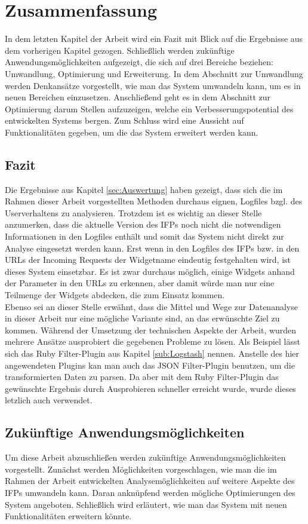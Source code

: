 \section{Zusammenfassung}
\label{sec:Zusammenfassung}
In dem letzten Kapitel der Arbeit wird ein Fazit mit Blick auf die Ergebnisse aus dem vorherigen Kapitel gezogen. Schließlich werden zukünftige Anwendungsmöglichkeiten aufgezeigt, die sich auf drei Bereiche beziehen: Umwandlung, Optimierung und Erweiterung. In dem Abschnitt zur Umwandlung werden Denkansätze vorgestellt, wie man das System umwandeln kann, um es in neuen Bereichen einzusetzen. Anschließend geht es in dem Abschnitt zur Optimierung darum Stellen aufzuzeigen, welche ein Verbesserungspotential des entwickelten Systems bergen. Zum Schluss wird eine Aussicht auf Funktionalitäten gegeben, um die das System erweitert werden kann.
\subsection{Fazit}
\label{sub:Fazit}
Die Ergebnisse aus Kapitel \ref{sec:Auswertung} haben gezeigt, dass sich die im Rahmen dieser Arbeit vorgestellten Methoden durchaus eignen, Logfiles bzgl. des Userverhaltens zu analysieren. Trotzdem ist es wichtig an dieser Stelle anzumerken, dass die aktuelle Version des IFPs noch nicht die notwendigen Informationen in den Logfiles enthält und somit das System nicht direkt zur Analyse eingesetzt werden kann. Erst wenn in den Logfiles des IFPs bzw. in den URLs der Incoming Requests der Widgetname eindeutig festgehalten wird, ist dieses System einsetzbar. Es ist zwar durchaus möglich, einige Widgets anhand der Parameter in den URLs zu erkennen, aber damit würde man nur eine Teilmenge der Widgets abdecken, die zum Einsatz kommen.\\
Ebenso sei an dieser Stelle erwähnt, dass die Mittel und Wege zur Datenanalyse in dieser Arbeit nur eine mögliche Variante sind, an das erwünschte Ziel zu kommen. Während der Umsetzung der technischen Aspekte der Arbeit, wurden mehrere Ansätze ausprobiert die gegebenen Probleme zu lösen. Als Beispiel lässt sich das Ruby Filter-Plugin aus Kapitel \ref{sub:Logstash} nennen. Anstelle des hier angewendeten Plugins kan man auch das JSON Filter-Plugin benutzen, um die transformierten Daten zu parsen. Da aber mit dem Ruby Filter-Plugin das gewünschte Ergebnis durch Ausprobieren schneller erreicht wurde, wurde dieses letzlich auch verwendet.

\subsection{Zukünftige Anwendungsmöglichkeiten}
\label{sub:Zukünftige Anwendungsmöglichkeiten}
Um diese Arbeit abzuschließen werden zukünftige Anwendungsmöglichkeiten vorgestellt. Zunächst werden Möglichkeiten vorgeschlagen, wie man die im Rahmen der Arbeit entwickelten Analysemöglichkeiten auf weitere Aspekte des IFPs umwandeln kann. Daran anknüpfend werden mögliche Optimierungen des System angeboten. Schließlich wird erläutert, wie man das System mit neuen Funktionalitäten erweitern könnte.
